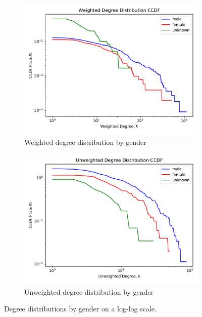 \begin{figure}[ht]
    \centering
    \begin{subfigure}{0.4\textwidth}
        \includegraphics[width=1.\textwidth]{images/degree_distr_ccdf_gender_weighted-Weighted.pdf}
        \caption{Weighted degree distribution by gender}
    \end{subfigure}
    \begin{subfigure}{0.4\textwidth}
        \includegraphics[width=1.\textwidth]{images/degree_distr_ccdf_gender_weighted-Unweighted.pdf}
        \caption{Unweighted degree distribution by gender}
    \end{subfigure}
    \caption{Degree distributions by gender on a log-log scale.}
    \label{fig:degree_distr_gender}
\end{figure}

